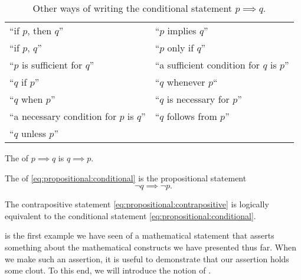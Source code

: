 \begin{table}[H]
  \centering
    \begin{tabular}{p{2in} p{2in}}
      ``if \(p\), then \(q\)''                     & ``\(p\) implies \(q\)'' \\
      ``if \(p\), \(q\)''                          & ``\(p\) only if \(q\)'' \\
      ``\(p\) is sufficient for \(q\)''            & ``a sufficient condition for \(q\) is \(p\)'' \\
      ``\(q\) if \(p\)''                           & ``\(q\) whenever \(p\)`` \\
      ``\(q\) when \(p\)''                         & ``\(q\) is necessary for \(p\)'' \\
      ``a necessary condition for \(p\) is \(q\)'' & ``\(q\) follows from \(p\)'' \\
      ``\(q\) unless \(p\)''
    \end{tabular}
  \caption{Other ways of writing the conditional statement \(p \implies q\).}
  \label{tab:conditionals}
\end{table}

\begin{defn}[converse]
  The  of \(p \implies q\) is \(q \implies p\).
\end{defn}

\begin{defn}[contrapositive]
  The  of
  \eqref{eq:propositional:conditional}
  is the propositional statement
  \begin{equation}
    \neg q \implies \neg p.
    \label{eq:propositional:contrapositive}
  \end{equation}
  \label{def:contrapositive}
\end{defn}

\begin{theorem}
  The contrapositive statement
  \eqref{eq:propositional:contrapositive}
  is logically equivalent to the conditional statement
  \eqref{eq:propositional:conditional}.
  \label{thm:contrapositive-conditional}
\end{theorem}

 is the first example we have seen
of a mathematical statement that asserts something about the mathematical
constructs we have presented thus far.
When we make such an assertion, it is useful to demonstrate that our assertion
holds some clout.
To this end, we will introduce the notion of .

